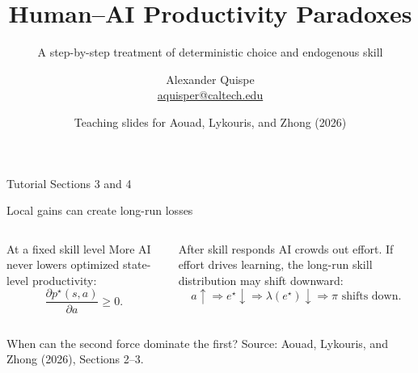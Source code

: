 \documentclass[aspectratio=169,10pt]{beamer}
\title{Human--AI Productivity Paradoxes}
\subtitle{A step-by-step treatment of deterministic choice and endogenous skill}
\author{Alexander Quispe\\[-1mm]\small\href{mailto:aquisper@caltech.edu}{aquisper@caltech.edu}}
\date{\small Teaching slides for Aouad, Lykouris, and Zhong (2026)}
\newcommand{\source}[1]{\vfill{\scriptsize\color{muted}Source: #1}}
\begin{document}

\begin{frame}[plain]
  \vspace{15mm}
  {\color{white}\inserttitle\par}
  \vspace{3mm}
  {\color{white!86}\insertsubtitle\par}
  \vspace{12mm}
  {\color{white}\large Tutorial Sections 3 and 4\par}
  \vfill
  {\color{white}\insertauthor\par}
  \vspace{2mm}
  {\color{white!70}\insertdate\par}
\end{frame}

\begin{frame}{Local gains can create long-run losses}
\begin{columns}[T,onlytextwidth]
\begin{block}{At a fixed skill level}
More AI never lowers optimized state-level productivity:
\[
\frac{\partial p^\star(s,a)}{\partial a}\ge 0.
\]
\end{block}
\begin{alertblock}{After skill responds}
AI crowds out effort. If effort drives learning, the long-run skill distribution may shift downward:
\[
a\uparrow\Rightarrow e^\star\downarrow
\Rightarrow\lambda(e^\star)\downarrow
\Rightarrow\pi\text{ shifts down}.
\]
\end{alertblock}
\end{columns}
\vspace{3mm}
\centering
\large When can the second force dominate the first?
\source{Aouad, Lykouris, and Zhong (2026), Sections 2--3.}
\end{frame}
\end{document}
